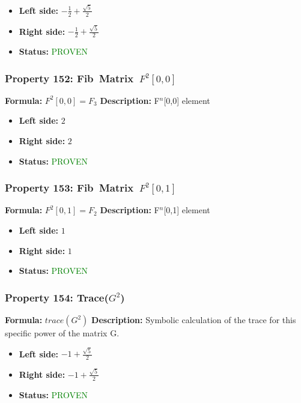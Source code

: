 \begin{itemize}
\item \textbf{Left side:} $- \frac{1}{2} + \frac{\sqrt{5}}{2}$
\item \textbf{Right side:} $- \frac{1}{2} + \frac{\sqrt{5}}{2}$
\item \textbf{Status:} \textcolor{green}{PROVEN}
\end{itemize}

\subsubsection*{Property 152: Fib~Matrix~$F^{2}$$[0,0]$}
\textbf{Formula:} $F^2[0,0] = F_3$
\textbf{Description:} F$^n$[0,0] element

\begin{itemize}
\item \textbf{Left side:} $2$
\item \textbf{Right side:} $2$
\item \textbf{Status:} \textcolor{green}{PROVEN}
\end{itemize}

\subsubsection*{Property 153: Fib~Matrix~$F^{2}$$[0,1]$}
\textbf{Formula:} $F^2[0,1] = F_2$
\textbf{Description:} F$^n$[0,1] element

\begin{itemize}
\item \textbf{Left side:} $1$
\item \textbf{Right side:} $1$
\item \textbf{Status:} \textcolor{green}{PROVEN}
\end{itemize}

\subsubsection*{Property 154: Trace($G^{2}$)}
\textbf{Formula:} $trace(G^2)$
\textbf{Description:} Symbolic calculation of the trace for this specific power of the matrix G.

\begin{itemize}
\item \textbf{Left side:} $-1 + \frac{\sqrt{5}}{2}$
\item \textbf{Right side:} $-1 + \frac{\sqrt{5}}{2}$
\item \textbf{Status:} \textcolor{green}{PROVEN}
\end{itemize}

